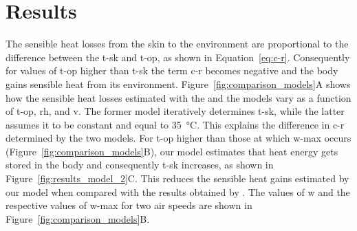 

\section{Results}\label{sec:results}

The sensible heat losses from the skin to the environment are proportional to the difference between the \ac{t-sk} and \ac{t-op}, as shown in Equation~\ref{eq:c-r}.
Consequently for values of \ac{t-op} higher than \ac{t-sk} the term \ac{c-r} becomes negative and the body gains sensible heat from its environment.
Figure~\ref{fig:comparison_models}A shows how the sensible heat losses estimated with the  and the  models vary as a function of \ac{t-op}, \ac{rh}, and \ac{v}.
The former model iteratively determines \ac{t-sk}, while the latter assumes it to be constant and equal to 35~°C.
This explains the difference in \ac{c-r} determined by the two models.
For \ac{t-op} higher than those at which \ac{w-max} occurs (Figure~\ref{fig:comparison_models}B), our model estimates that heat energy gets stored in the body and consequently \ac{t-sk} increases, as shown in Figure~\ref{fig:results_model_2}C.
This reduces the sensible heat gains estimated by our model when compared with the results obtained by .
The values of \ac{w} and the respective values of \ac{w-max} for two air speeds are shown in Figure~\ref{fig:comparison_models}B\@.

